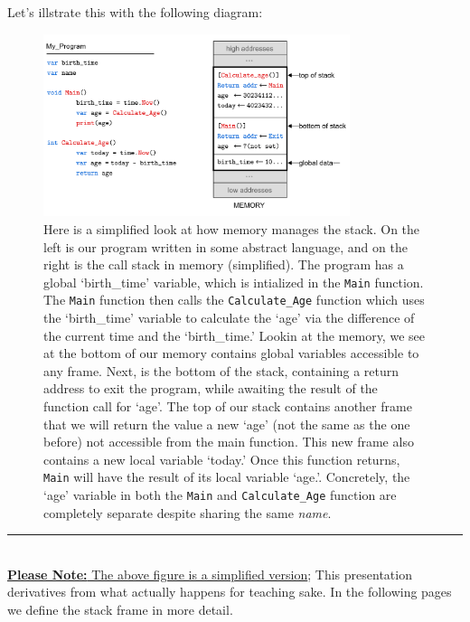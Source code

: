 \newpage 

\noindent
Let's illstrate this with the following diagram:

\begin{figure}[h]
    \centering
    \includegraphics[width=0.8\textwidth]{./Sections/stacks_heaps/call_stack.png}
    \caption{Here is a simplified look at how memory manages the stack. On the left is our program written 
    in some abstract language, and on the right is the call stack in memory (simplified). 
    The program has a global `birth\_time' variable, which is intialized in the \texttt{Main} function. The \texttt{Main} function
    then calls the \texttt{Calculate\_Age} function which uses the `birth\_time' variable to calculate the `age' via the difference of 
    the current time and the `birth\_time.'
    Lookin at the memory, we see at the bottom of our memory contains global variables accessible to any frame. Next, is the bottom of the stack, containing a return address to exit 
    the program, while awaiting the result of the function call for `age'. The top of our stack contains another frame that we will return the value
    a new `age' (not the same as the one before) not accessible from the main function. This new frame also contains a new local variable `today.'
    Once this function returns, \texttt{Main} will have the result of its local variable `age.'. Concretely, the 
    `age' variable in both the \texttt{Main} and \texttt{Calculate\_Age} function are completely separate despite sharing the same \textit{name}.}
    \label{fig:call_stack}
\end{figure}

\noindent
\rule{\textwidth}{0.4pt}\\

\noindent
\underline{\textbf{Please Note:} The above figure is a simplified version}; This presentation derivatives from what actually happens
for teaching sake. In the following pages we define the stack frame in more detail.

